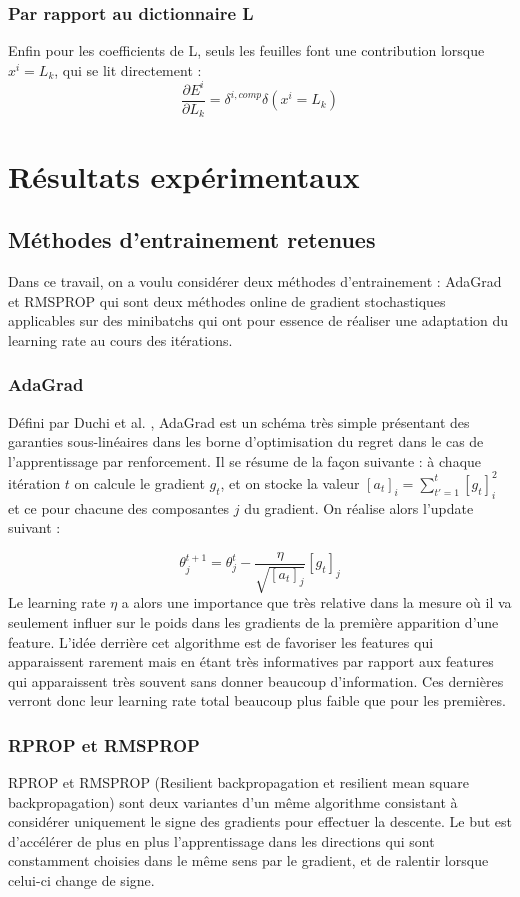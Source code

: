 \documentclass[conference]{IEEEtran}
\begin{document}
\subsubsection{Par rapport au dictionnaire L}
Enfin pour les coefficients de L, seuls les feuilles font une contribution lorsque $x^i=L_k$, qui se lit directement :
$$\frac{\partial E^i}{\partial L_k} = \delta^{i,comp}\delta(x^i=L_k)$$

\section{Résultats expérimentaux}
\subsection{Méthodes d'entrainement retenues}
Dans ce travail, on a voulu considérer deux méthodes d'entrainement : AdaGrad et RMSPROP qui sont deux méthodes online de gradient stochastiques applicables sur des minibatchs qui ont pour essence de réaliser une adaptation du learning rate au cours des itérations.

\subsubsection{AdaGrad}
Défini par Duchi et al. \cite{Duchi:2011:ASM:1953048.2021068}, AdaGrad est un schéma très simple présentant des garanties sous-linéaires dans les borne d'optimisation du regret dans le cas de l'apprentissage par renforcement. Il se résume de la façon suivante : à chaque itération $t$ on calcule le gradient $g_t$, et on stocke la valeur $[a_t]_i=\sum_{t'=1}^t [g_t]_i^2$ et ce pour chacune des composantes $j$ du gradient. On réalise alors l'update suivant :

$$\theta^{t+1}_j=\theta^{t}_j-\frac{\eta}{\sqrt{[a_t]_j}}[g_t]_j$$
Le learning rate $\eta$ a alors une importance que très relative dans la mesure où il va seulement influer sur le poids dans les gradients de la première apparition d'une feature. L'idée derrière cet algorithme est de favoriser les features qui apparaissent rarement mais en étant très informatives par rapport aux features qui apparaissent très souvent sans donner beaucoup d'information. Ces dernières verront donc leur learning rate total beaucoup plus faible que pour les premières.

\subsubsection{RPROP et RMSPROP}
RPROP et RMSPROP (Resilient backpropagation et resilient mean square backpropagation) sont deux variantes d'un même algorithme consistant à considérer uniquement le signe des gradients pour effectuer la descente. Le but est d'accélérer de plus en plus l'apprentissage dans les directions qui sont constamment choisies dans le même sens par le gradient, et de ralentir lorsque celui-ci change de signe. 
\end{document}
